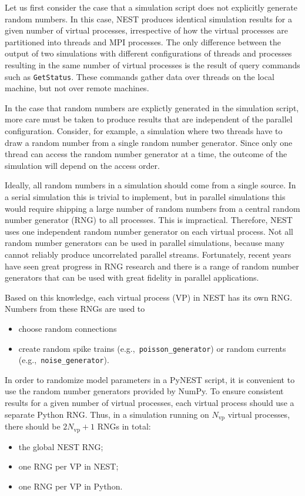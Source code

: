 \documentclass{article}
\newcommand{\Nvp}{N_{\text{vp}}}
\begin{document}
Let us first consider the case that a simulation script does not
explicitly generate random numbers. In this case, NEST produces
identical simulation results for a given number of virtual processes,
irrespective of how the virtual processes are partitioned into threads
and MPI processes. The only difference between the output of two
simulations with different configurations of threads and processes
resulting in the same number of virtual processes is the result of
query commands such as \lstinline!GetStatus!. These commands 
gather data over threads on the local machine, but not over remote
machines.

In the case that random numbers are explictly generated in the
simulation script, more care must be taken to produce results that are
independent of the parallel configuration. Consider, for example, a
simulation where two threads have to draw a random number from a
single random number generator. Since only one thread can access the
random number generator at a time, the outcome of the simulation will
depend on the access order.

Ideally, all random numbers in a simulation should come from a single
source. In a serial simulation this is trivial to implement, but in
parallel simulations this would require shipping a large number of
random numbers from a central random number generator (RNG) to all
processes. This is impractical.  Therefore, NEST uses one independent
random number generator on each
virtual process. Not all random number generators can be used in
parallel simulations, because many cannot reliably produce
uncorrelated parallel streams. Fortunately, recent years have seen
great progress in RNG research and there is a range of random number
generators that can be used with great fidelity in parallel
applications.

Based on this knowledge, each virtual process (VP) in NEST has its own
RNG. Numbers from these RNGs are used to
\begin{itemize}
\item choose random connections
\item create random spike trains (e.g.,\ \lstinline!poisson_generator!)
  or random currents
  (e.g.,\ \lstinline!noise_generator!).
\end{itemize}

In order to randomize model parameters in a PyNEST script, it is
convenient to use the random number generators provided by
NumPy. To ensure consistent results for a given number
of virtual processes, each virtual process should use a separate
Python RNG. Thus, in a simulation running on $\Nvp$ virtual processes,
there should be $2\Nvp+1$ RNGs in total:
\begin{itemize}
\item the global NEST RNG;
\item one RNG per VP in NEST;
\item one RNG per VP in Python.
\end{itemize}
\end{document}
